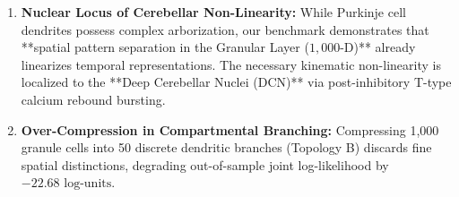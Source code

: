 \documentclass[11pt,twoside,a4paper]{article}
\begin{document}
\begin{enumerate}
    \item \textbf{Nuclear Locus of Cerebellar Non-Linearity:}
    While Purkinje cell dendrites possess complex arborization, our benchmark demonstrates that **spatial pattern separation in the Granular Layer ($1,000$-D)** already linearizes temporal representations. The necessary kinematic non-linearity is localized to the **Deep Cerebellar Nuclei (DCN)** via post-inhibitory T-type calcium rebound bursting.
    
    \item \textbf{Over-Compression in Compartmental Branching:}
    Compressing 1,000 granule cells into 50 discrete dendritic branches (Topology B) discards fine spatial distinctions, degrading out-of-sample joint log-likelihood by $-22.68\text{ log-units}$.
\end{enumerate}
\end{document}
